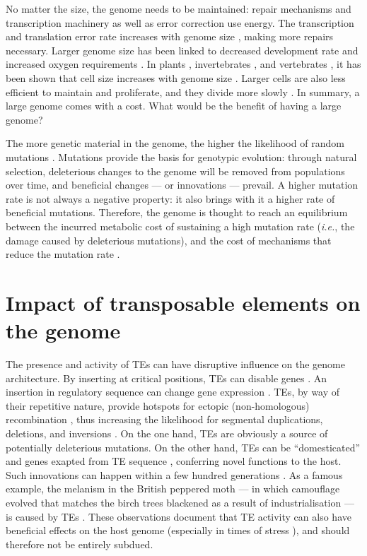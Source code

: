 No matter the size, the genome needs to be maintained: repair mechanisms
and transcription machinery as well as error correction use energy.  The
transcription and translation error rate increases with genome size
\citep{Zaher2009}, making more repairs necessary.  Larger genome size has
been linked to decreased development rate \citep{White2000} and
increased oxygen requirements \citep{Vinogradov1997, Gregory2002}.  In
plants \citep{Grime1983}, invertebrates \citep{Gregory2005}, and
vertebrates \citep{Horner1983, Olmo1982, Gregory2000}, it has been shown
that cell size increases with genome size \citep{Dufresne2011}.  Larger
cells are also less efficient to maintain and proliferate, and they
divide more slowly \citep{Bennett1977}.  In summary, a large genome comes
with a cost.  What would be the benefit of having a large genome?

The more genetic material in the genome, the higher the likelihood of
random mutations \citep{Wielgoss2011}.  Mutations provide the basis for
genotypic evolution: through natural selection, deleterious changes to
the genome will be removed from populations over time, and beneficial
changes --- or innovations --- prevail.  A higher mutation rate is not
always a negative property: it also brings with it a higher rate of
beneficial mutations.  Therefore, the genome is thought to reach an
equilibrium between the incurred metabolic cost of sustaining a high
mutation rate (\emph{i.e.}, the damage caused by deleterious mutations),
and the cost of mechanisms that reduce the mutation rate
\citep{Bernstein1987, Altenberg2011}.

\section{Impact of transposable elements on the genome}

The presence and activity of TEs can have disruptive influence on the
genome architecture.  By inserting at critical positions, TEs can disable
genes \citep{Kazazian1988}.  An insertion in regulatory sequence can
change gene expression \citep{Warnefors2010}.  TEs, by way of their
repetitive nature, provide hotspots for ectopic (non-homologous)
recombination \citep{Lim1988, Gray2000, Fiston-Lavier2007}, thus
increasing the likelihood for segmental duplications, deletions, and
inversions \citep{Mathiopoulos1998, Remnant2013}.  On the one hand, TEs
are obviously a source of potentially deleterious mutations.  On the
other hand, TEs can be ``domesticated'' and genes exapted from TE
sequence \citep{Gahan2001, Daborn2002, Aminetzach2005, Chen2007},
conferring novel functions to the host.  Such innovations can happen
within a few hundred generations \citep{Dolgin2006, Struchiner2009,
Kofler2015}.  As a famous example, the melanism in the British peppered
moth --- in which camouflage evolved that matches the birch trees
blackened as a result of industrialisation --- is caused by TEs
\citep{Hof2016}.  These observations document that TE activity can also
have beneficial effects on the host genome (especially in times of
stress \citep{Chenais2012}), and should therefore not be entirely
subdued.

